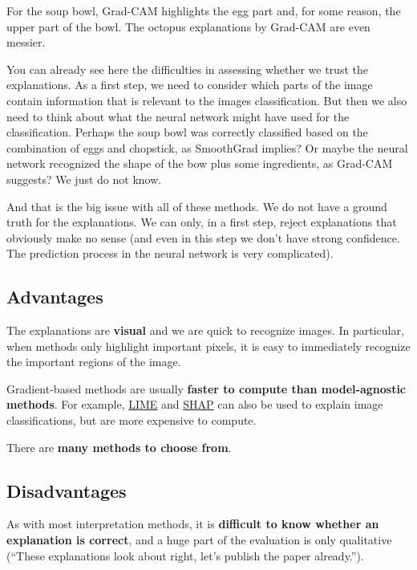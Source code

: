 \documentclass[
  12pt,
]{krantz}
\begin{document}
For the soup bowl, Grad-CAM highlights the egg part and, for some reason, the upper part of the bowl.
The octopus explanations by Grad-CAM are even messier.

You can already see here the difficulties in assessing whether we trust the explanations.
As a first step, we need to consider which parts of the image contain information that is relevant to the images classification.
But then we also need to think about what the neural network might have used for the classification.
Perhaps the soup bowl was correctly classified based on the combination of eggs and chopstick, as SmoothGrad implies?
Or maybe the neural network recognized the shape of the bow plus some ingredients, as Grad-CAM suggests?
We just do not know.

And that is the big issue with all of these methods.
We do not have a ground truth for the explanations.
We can only, in a first step, reject explanations that obviously make no sense (and even in this step we don't have strong confidence. The prediction process in the neural network is very complicated).

\hypertarget{advantages-19}{%
\subsection{Advantages}\label{advantages-19}}

The explanations are \textbf{visual} and we are quick to recognize images.
In particular, when methods only highlight important pixels, it is easy to immediately recognize the important regions of the image.

Gradient-based methods are usually \textbf{faster to compute than model-agnostic methods}.
For example, \protect\hyperlink{lime}{LIME} and \protect\hyperlink{shap}{SHAP} can also be used to explain image classifications, but are more expensive to compute.

There are \textbf{many methods to choose from}.

\hypertarget{disadvantages-19}{%
\subsection{Disadvantages}\label{disadvantages-19}}

As with most interpretation methods, it is \textbf{difficult to know whether an explanation is correct}, and a huge part of the evaluation is only qualitative (``These explanations look about right, let's publish the paper already.'').
\end{document}
